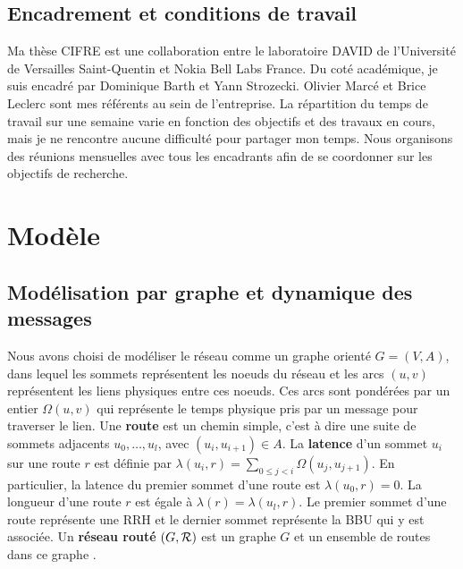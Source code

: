 \documentclass{article}
\begin{document}
  \subsection*{Encadrement et conditions de travail}
  Ma thèse CIFRE est une collaboration entre le laboratoire DAVID de l'Université de Versailles Saint-Quentin et Nokia Bell Labs France.
  Du coté académique, je suis encadré par Dominique Barth et Yann Strozecki. Olivier Marcé et Brice Leclerc sont mes référents au sein de l'entreprise. La répartition du temps de travail sur une semaine varie en fonction des objectifs et des travaux en cours, mais je ne rencontre aucune difficulté pour partager mon temps. Nous organisons des réunions mensuelles avec tous les encadrants afin de se coordonner sur les objectifs de recherche.
  
\section{Modèle}

\subsection{Modélisation par graphe et dynamique des messages}
  Nous avons choisi de modéliser le réseau comme un graphe orienté $G=(V,A)$, dans lequel les sommets représentent les noeuds du réseau et les arcs $(u,v)$ représentent les liens physiques entre ces noeuds. Ces arcs sont pondérées par un entier $\Omega(u,v)$  qui représente le temps physique pris par un message pour traverser le lien. Une {\bf route} est un chemin simple, c'est à dire une suite de sommets adjacents $u_0, \ldots , u_{l}$, avec $(u_i,u_{i+1}) \in A$. La {\bf latence} d'un sommet $u_i$ sur une route $r$ est définie par $\lambda(u_i,r)= \sum\limits_{0 \leq j <i} \Omega(u_j, u_{j+1})$. En particulier, la latence du premier sommet d'une route est $\lambda(u_0,r)=0$. La longueur d'une route $r$ est égale à  $\lambda (r)= \lambda (u_l,r)$. 
  Le premier sommet d'une route représente une RRH et le dernier sommet représente la BBU qui y est associée.
  Un {\bf réseau routé} $(G, {\cal R})$ est un graphe $G$ et un ensemble de routes dans ce graphe .
  
\end{document}
